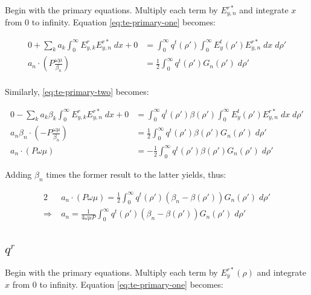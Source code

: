 \documentclass[11pt, oneside]{article}   	%
\begin{document}
Begin with the primary equations. Multiply each term by $E_{y,n}^{r*}$ and integrate $x$ from 0 to infinity. Equation \eqref{eq:te-primary-one} becomes:

\begin{align*}
0 + \sum_{k} a_{k} \int_{0}^{\infty} E_{y,k}^{r} E_{y,n}^{r*} \; dx + 0 &= \int_{0}^{\infty} q^{t} (\rho ') \int_{0}^{\infty} E_{y}^{t}(\rho ') E_{y,n}^{r*} \; dx \; d\rho ' \\
a_{n} \cdot \left( P \frac{\omega \mu}{\beta_{n}} \right) &= \frac{1}{2} \int_{0}^{\infty} q^{t} (\rho ') G_{n} (\rho ') \; d\rho' \\
\end{align*}

\noindent Similarly, \eqref{eq:te-primary-two} becomes:

\begin{align*}
0 - \sum_{k} a_{k}\beta_{k} \int_{0}^{\infty} E_{y,k}^{r} E_{y,n}^{r*} \; dx + 0 &= \int_{0}^{\infty} q^{t} (\rho ') \beta (\rho ') \int_{0}^{\infty} E_{y}^{t}(\rho ') E_{y,n}^{r*} \; dx \; d\rho ' \\
a_{n} \beta_{n} \cdot \left( -P \frac{\omega \mu}{\beta_{n}} \right) &= \frac{1}{2} \int_{0}^{\infty} q^{t} (\rho ') \beta(\rho ')G_{n} (\rho ') \; d\rho' \\
a_{n} \cdot \left( P \omega \mu \right) &= -\frac{1}{2} \int_{0}^{\infty} q^{t} (\rho ') \beta(\rho ') G_{n} (\rho ') \; d\rho'
\end{align*}

\noindent

Adding $\beta_{n}$ times the former result to the latter yields, thus:

\begin{align}
2 &a_{n} \cdot \left( P \omega \mu \right) = \frac{1}{2} \int_{0}^{\infty} q^{t} (\rho ') (\beta_{n} - \beta(\rho ')) G_{n} (\rho ') \; d\rho' \nonumber \\
\Rightarrow \; &a_{n} = \frac{1}{4 \omega \mu P} \int_{0}^{\infty} q^{t} (\rho ') (\beta_{n} - \beta(\rho ')) G_{n} (\rho ') \; d\rho' \\
\end{align}




\subsection{$q^{r}$}

Begin with the primary equations. Multiply each term by $E_{y}^{r*}(\rho)$ and integrate $x$ from 0 to infinity. Equation \eqref{eq:te-primary-one} becomes:
\end{document}
